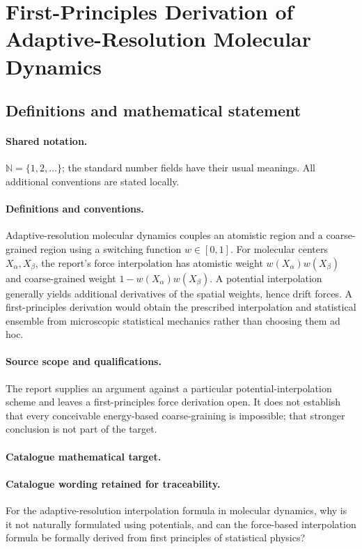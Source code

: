 \documentclass[11pt]{article}
\begin{document}
\section{First-Principles Derivation of Adaptive-Resolution Molecular Dynamics}\label{statement}

\subsection{Definitions and mathematical statement}

\paragraph{Shared notation.}$\mathbb N=\{1,2,\ldots\}$; the standard number fields have their usual meanings. All additional conventions are stated locally.


\paragraph{Definitions and conventions.} Adaptive-resolution molecular dynamics couples an atomistic region and a coarse-grained region using a switching function $w\in[0,1]$. For molecular centers $X_\alpha,X_\beta$, the report's force interpolation has atomistic weight $w(X_\alpha)w(X_\beta)$ and coarse-grained weight $1-w(X_\alpha)w(X_\beta)$. A potential interpolation generally yields additional derivatives of the spatial weights, hence drift forces. A first-principles derivation would obtain the prescribed interpolation and statistical ensemble from microscopic statistical mechanics rather than choosing them ad hoc.

\paragraph{Source scope and qualifications.} The report supplies an argument against a particular potential-interpolation scheme and leaves a first-principles force derivation open. It does not establish that every conceivable energy-based coarse-graining is impossible; that stronger conclusion is not part of the target.

\paragraph{Catalogue mathematical target.}
\paragraph{Catalogue wording retained for traceability.}
For the adaptive-resolution interpolation formula in molecular dynamics, why is it not naturally formulated using potentials, and can the force-based interpolation formula be formally derived from first principles of statistical physics?
\end{document}
